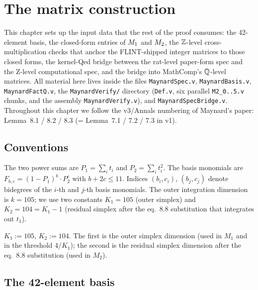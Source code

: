 \chapter{The matrix construction}\label{ch:matrix}

This chapter sets up the input data that the rest of the proof consumes:
the 42-element basis, the closed-form entries of $M_1$ and $M_2$,
the $\mathbb{Z}$-level cross-multiplication checks that anchor the
FLINT-shipped integer matrices to those closed forms, the kernel-Qed
bridge between the rat-level paper-form spec and the Z-level
computational spec, and the bridge into MathComp's $\mathbb{Q}$-level matrices.
All material here lives inside the files \texttt{MaynardSpec.v},
\texttt{MaynardBasis.v}, \texttt{MaynardFactQ.v}, the
\texttt{MaynardVerify/} directory (\texttt{Def.v}, six parallel
\texttt{M2\_0..5.v} chunks, and the assembly \texttt{MaynardVerify.v}),
and \texttt{MaynardSpecBridge.v}. Throughout this chapter we follow the
v3/Annals numbering of Maynard's paper: Lemma~8.1 / 8.2 / 8.3 (=
Lemma~7.1 / 7.2 / 7.3 in v1).

\section{Conventions}

\begin{convention}
The two power sums are
$P_1 = \sum_i t_i$ and $P_2 = \sum_i t_i^2$. The basis monomials are
$F_{b,c} = (1 - P_1)^b \cdot P_2^c$ with $b + 2c \le 11$. Indices
$(b_i, c_i)$, $(b_j, c_j)$ denote bidegrees of the $i$-th and $j$-th
basis monomials. The outer integration dimension is $k = 105$; we use
two constants $K_1 = 105$ (outer simplex) and $K_2 = 104 = K_1 - 1$
(residual simplex after the eq.~8.8 substitution that integrates out
$t_1$).
\end{convention}

\begin{definition}[Constants $K_1$, $K_2$]\label{def:K1K2}
\rocqok
$K_1 := 105$, $K_2 := 104$. The first is the outer simplex dimension
(used in $M_1$ and in the threshold $4/K_1$); the second is the
residual simplex dimension after the eq.~8.8 substitution (used in $M_2$).
\end{definition}

\section{The 42-element basis}

